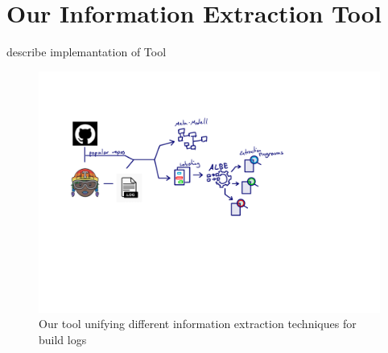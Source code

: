 \documentclass[\myrootdir/main.tex]{subfiles}
\begin{document}
\chapter{Our Information Extraction Tool}
\label{sec:implementation}
describe implemantation of Tool
\begin{figure}[h]
	\centering
	\includegraphics[page=7, width=\textwidth, trim={0.5cm 0.5cm 0.5cm 0.5cm}, clip]{img/flow-of-research.pdf}
	\caption{Our tool unifying different information extraction techniques for build logs}
	\label{fig:tool}
\end{figure}
\end{document}
